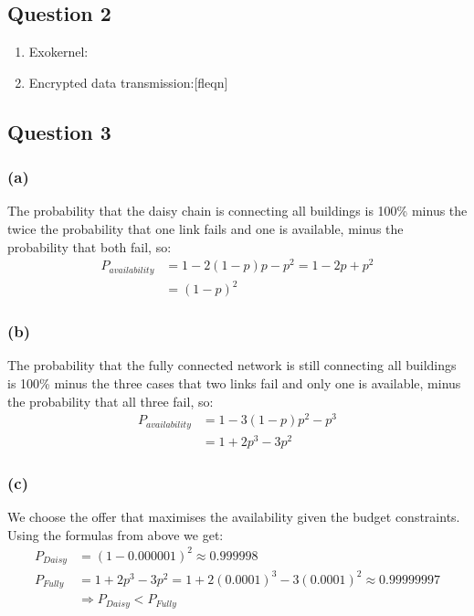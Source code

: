 \documentclass[12pt,a4paper,fleqn]{article}
\begin{document}
\subsection*{Question 2}
\label{sec:pq2}

\begin{enumerate}
  \item Exokernel:
  \item Encrypted data transmission:[fleqn]
\end{enumerate}

\subsection*{Question 3}
\label{sec:pq3}

\subsubsection*{(a)}
The probability that the daisy chain is connecting all buildings is 100\% minus the twice the probability that one link fails and one is available, minus the probability that both fail, so: 
\begin{align*}
P_{availability} &= 1-2(1-p)p - p^2 = 1-2p + p^2 \\
&= (1-p)^2
\end{align*}

\subsubsection*{(b)}
The probability that the fully connected network is still connecting all buildings is 100\% minus the three cases that two links fail and only one is available, minus the probability that all three fail, so:
\begin{align*}
P_{availability} &= 1-3(1-p)p^2 - p^3 \\
&= 1 + 2p^3 - 3p^2
\end{align*}

\subsubsection*{(c)}
We choose the offer that maximises the availability given the budget constraints. Using the formulas from above we get:
\begin{align*}
P_{Daisy} &= (1-0.000001)^2 \approx 0.999998 \\
P_{Fully} &= 1 + 2p^3 - 3p^2 = 1 + 2(0.0001)^3-3(0.0001)^2 \approx 0.99999997 \\ 
&\Rightarrow P_{Daisy} < P_{Fully}
\end{align*}
\end{document}

